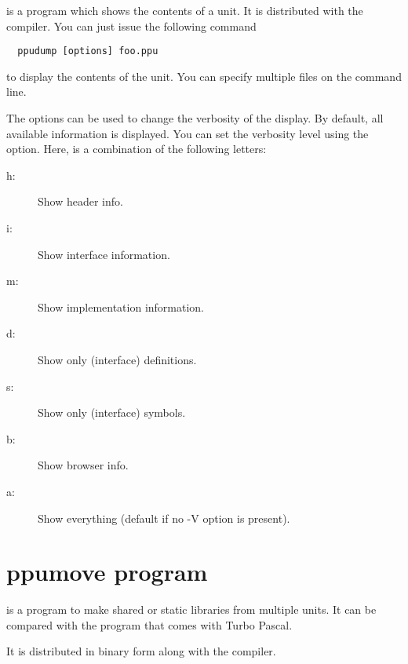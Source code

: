  is a program which shows the contents of a \fpc unit. It
is distributed with the compiler. You can just issue the following command
\begin{verbatim}
  ppudump [options] foo.ppu
\end{verbatim}
to display the contents of the  unit. You can specify multiple
files on the command line.

The options can be used to change the verbosity of the display. By default,
all available information is displayed.
You can set the verbosity level using the  option.
Here,  is a combination of the following
letters:
\begin{description}
\item [h:\ ] Show header info.
\item [i:\ ] Show interface information.
\item [m:\ ] Show implementation information.
\item [d:\ ] Show only (interface) definitions.
\item [s:\ ] Show only (interface) symbols.
\item [b:\ ] Show browser info.
\item [a:\ ] Show everything (default if no -V option is present).
\end{description}


\section{ppumove program}
\label{se:ppumove}

 is a program to make shared or static libraries from
multiple units. It can be compared with the  program that
comes with Turbo Pascal.

It is distributed in binary form along with the compiler.

